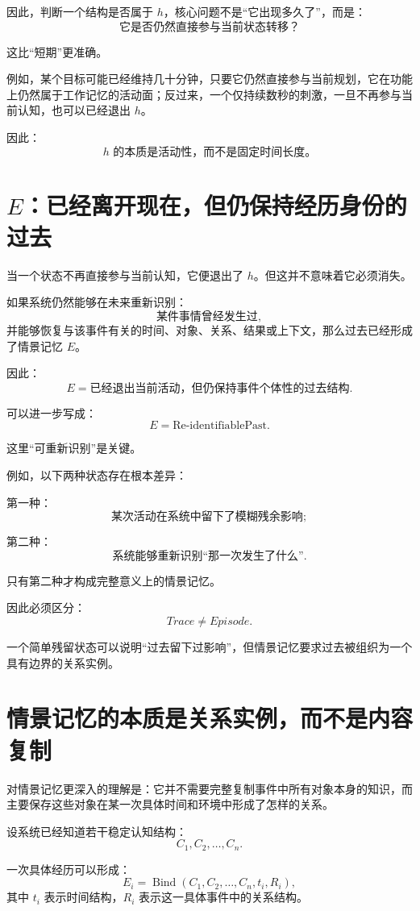 因此，判断一个结构是否属于 $h$，核心问题不是“它出现多久了”，而是：
\[
\boxed{
\text{它是否仍然直接参与当前状态转移？}
}
\]

这比“短期”更准确。

例如，某个目标可能已经维持几十分钟，只要它仍然直接参与当前规划，它在功能上仍然属于工作记忆的活动面；反过来，一个仅持续数秒的刺激，一旦不再参与当前认知，也可以已经退出 $h$。

因此：
\[
\boxed{
h\text{ 的本质是活动性，而不是固定时间长度。}
}
\]

\section{$E$：已经离开现在，但仍保持经历身份的过去}

当一个状态不再直接参与当前认知，它便退出了 $h$。但这并不意味着它必须消失。

如果系统仍然能够在未来重新识别：
\[
\text{某件事情曾经发生过},
\]
并能够恢复与该事件有关的时间、对象、关系、结果或上下文，那么过去已经形成了情景记忆 $E$。

因此：
\[
\boxed{
E=
\text{已经退出当前活动，但仍保持事件个体性的过去结构}.
}
\]

可以进一步写成：
\[
\boxed{
E=
\text{Re-identifiablePast}.
}
\]

这里“可重新识别”是关键。

例如，以下两种状态存在根本差异：

第一种：
\[
\text{某次活动在系统中留下了模糊残余影响};
\]

第二种：
\[
\text{系统能够重新识别“那一次发生了什么”}.
\]

只有第二种才构成完整意义上的情景记忆。

因此必须区分：
\[
\boxed{
Trace\neq Episode.
}
\]

一个简单残留状态可以说明“过去留下过影响”，但情景记忆要求过去被组织为一个具有边界的关系实例。

\section{情景记忆的本质是关系实例，而不是内容复制}

对情景记忆更深入的理解是：它并不需要完整复制事件中所有对象本身的知识，而主要保存这些对象在某一次具体时间和环境中形成了怎样的关系。

设系统已经知道若干稳定认知结构：
\[
C_1,C_2,\ldots,C_n.
\]

一次具体经历可以形成：
\[
E_i=
\operatorname{Bind}
(
C_1,C_2,\ldots,C_n,
t_i,
R_i
),
\]
其中 $t_i$ 表示时间结构，$R_i$ 表示这一具体事件中的关系结构。


